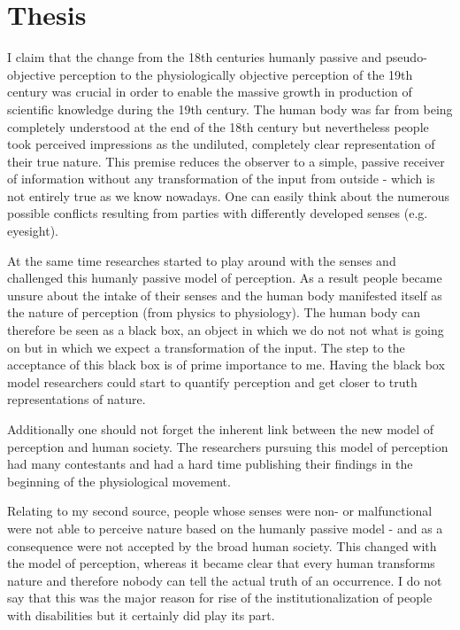 \documentclass[12pt,a4paper]{article}
\begin{document}
\section*{Thesis}

I claim that the change from the 18th centuries humanly passive and pseudo-objective
perception to the physiologically objective perception of the 19th century was crucial in order to
enable the massive growth in production of scientific knowledge during the 19th century.
The human body was far from being completely understood at the end of the 18th century but
nevertheless people took perceived impressions as the undiluted, completely clear representation of
their true nature.
This premise reduces the observer to a simple, passive receiver of information without any transformation
of the input from outside - which is not entirely true as we know nowadays.
One can easily think about the numerous possible conflicts resulting from parties with differently developed
senses (e.g. eyesight).

At the same time researches started to play around with the senses and challenged this humanly passive model
of perception. As a result people became unsure about the intake of their senses and the human body
manifested itself as the nature of perception (from physics to physiology). The human body can therefore be
seen as a black box, an object in which we do not not what is going on but in which we expect a
transformation of the input. The step to the acceptance of this black box is of prime importance to me.
Having the black box model researchers could start to quantify perception and get closer to truth
representations of nature.

Additionally one should not forget the inherent link between the new model of perception and human society.
The researchers pursuing this model of perception had many contestants and had a hard time publishing
their findings in the beginning of the physiological movement.

Relating to my second source, people whose senses were non- or malfunctional were not able to perceive nature
based on the humanly passive model - and as a consequence were not accepted by the broad human society. This
changed with the model of perception, whereas it became clear that every human transforms nature and
therefore nobody can tell the actual truth of an occurrence. I do not say that this was the major reason for
rise of the institutionalization of people with disabilities but it certainly did play its part.
\end{document}
